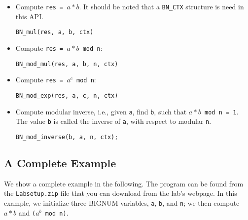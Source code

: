 \begin{itemize}
\item Compute \texttt{res = $a * b$}. It should be noted that a
\texttt{BN\_CTX} structure is need in this API.

\begin{lstlisting}
BN_mul(res, a, b, ctx)
\end{lstlisting}


\item Compute \texttt{res = $a * b$  mod n}:

\begin{lstlisting}
BN_mod_mul(res, a, b, n, ctx)
\end{lstlisting}



\item Compute \texttt{res = $a^c$ mod n}:

\begin{lstlisting}
BN_mod_exp(res, a, c, n, ctx)
\end{lstlisting}


\item Compute modular inverse, i.e., given \texttt{a}, find \texttt{b},
such that \texttt{$a * b$  mod n = 1}. The value \texttt{b} is called
the inverse of \texttt{a}, with respect to modular \texttt{n}.

\begin{lstlisting}
BN_mod_inverse(b, a, n, ctx);
\end{lstlisting}


\end{itemize}



\subsection{A Complete Example}

We show a complete example in the following. The program can be 
found from the \texttt{Labsetup.zip} file that you can download
from the lab's webpage. In this example, we
initialize three BIGNUM variables, \texttt{a}, \texttt{b}, and \texttt{n};
we then compute $a*b$ and \texttt{($a^b$ mod n)}.

